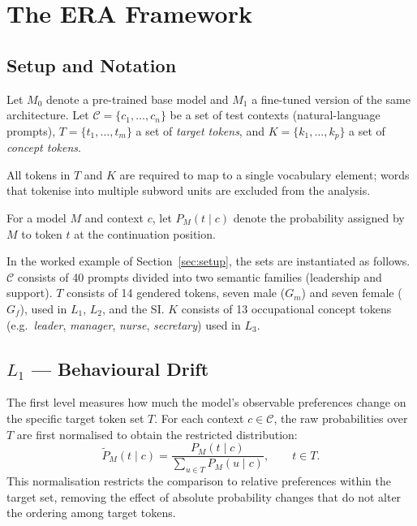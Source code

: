 \documentclass[11pt,a4paper]{article}
\begin{document}
\section{The ERA Framework}

\subsection{Setup and Notation}
\label{sec:notation}

Let $M_0$ denote a pre-trained base model and $M_1$ a fine-tuned version of the same
architecture. Let $\mathcal{C} = \{c_1, \dots, c_n\}$ be a set of test contexts
(natural-language prompts), $T = \{t_1, \dots, t_m\}$ a set of \emph{target tokens}, and
$K = \{k_1, \dots, k_p\}$ a set of \emph{concept tokens}.

All tokens in $T$ and $K$ are required to map to a single vocabulary element; words that
tokenise into multiple subword units are excluded from the analysis.

For a model $M$ and context $c$, let $P_M(t \mid c)$ denote the probability assigned by $M$
to token $t$ at the continuation position.

In the worked example of Section~\ref{sec:setup}, the sets are instantiated as follows.
$\mathcal{C}$ consists of 40 prompts divided into two semantic families (leadership and
support). $T$ consists of 14 gendered tokens, seven male ($G_m$) and seven female ($G_f$),
used in $L_1$, $L_2$, and the SI. $K$ consists of 13 occupational concept tokens (e.g.\
\emph{leader}, \emph{manager}, \emph{nurse}, \emph{secretary}) used in $L_3$.

\subsection{\texorpdfstring{$L_1$}{L1} --- Behavioural Drift}
\label{sec:l1}

The first level measures how much the model's observable preferences change on the specific
target token set $T$. For each context $c \in \mathcal{C}$, the raw probabilities over $T$
are first normalised to obtain the restricted distribution:
\[
  \tilde{P}_M(t \mid c)
  = \frac{P_M(t \mid c)}{\displaystyle\sum_{u \in T} P_M(u \mid c)},
  \qquad t \in T.
\]
This normalisation restricts the comparison to relative preferences within the target set,
removing the effect of absolute probability changes that do not alter the ordering among
target tokens.
\end{document}
